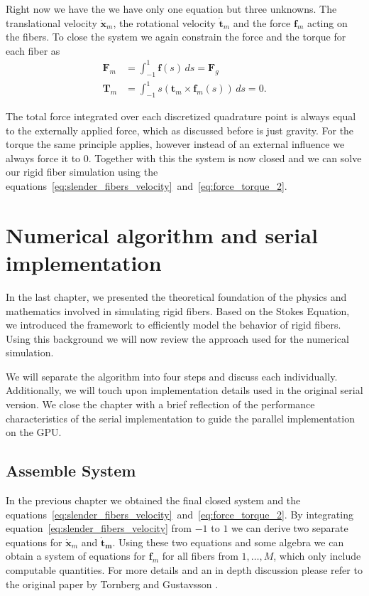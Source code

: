 \documentclass[a4paper,11pt]{kth-mag}
\begin{document}
Right now we have the we have only one equation but three unknowns. The translational velocity $\mathbf{\dot{x}}_m$, the rotational velocity $\mathbf{\dot{t}}_m$ and the force $\mathbf{f}_m$ acting on the fibers. To close the system we again constrain the force and the torque for each fiber as
\begin{equation}
  \label{eq:force_torque_2}
  \begin{aligned}
    \mathbf{F}_{m} &= \int_{-1}^{1} \mathbf{f}(s) \, ds = \mathbf{F}_g \\
    \mathbf{T}_{m} &= \int_{-1}^{1} s(\mathbf{t}_m \times \mathbf{f}_m(s)) \, ds = 0\text{.}
  \end{aligned}
\end{equation}

The total force integrated over each discretized quadrature point is always equal to the externally applied force, which as discussed before is just gravity. For the torque the same principle applies, however instead of an external influence we always force it to $0$. Together with this the system is now closed and we can solve our rigid fiber simulation using the equations~\eqref{eq:slender_fibers_velocity}~and~\eqref{eq:force_torque_2}.

\chapter{Numerical algorithm and serial implementation}
\label{cha:serial_implementation}

In the last chapter, we presented the theoretical foundation of the physics and mathematics involved in simulating rigid fibers. Based on the Stokes Equation, we introduced the framework to efficiently model the behavior of rigid fibers. Using this background we will now review the approach used for the numerical simulation.

We will separate the algorithm into four steps and discuss each individually. Additionally, we will touch upon implementation details used in the original serial version. We close the chapter with a brief reflection of the performance characteristics of the serial implementation to guide the parallel implementation on the GPU.

\section{Assemble System}
In the previous chapter we obtained the final closed system and the equations~\eqref{eq:slender_fibers_velocity}~and~\eqref{eq:force_torque_2}. By integrating equation~\eqref{eq:slender_fibers_velocity} from $-1$ to $1$ we can derive two separate equations for $\mathbf{\dot{x}}_m$ and $\mathbf{\dot{t}_m}$. Using these two equations and some algebra we can obtain a system of equations for $\mathbf{f}_m$ for all fibers from $1,\dots,M$, which only include computable quantities. For more details and an in depth discussion please refer to the original paper by Tornberg and Gustavsson \cite{Tornberg2006}.
\end{document}
